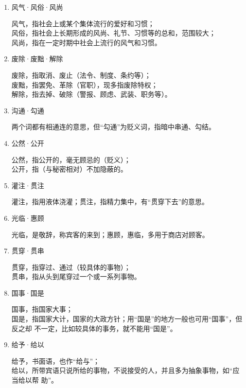 \documentclass[final,oneside]{ctexbook}
\begin{document}
\begin{enumerate}
    分辨，指把两个以上的人或事物区分开，有分析辨别的意思；\\
    分辩，指为消除所受的指责而进行解释、说明，与“辩解”意思相同。

  \item 风气·风俗·风尚

    风气，指社会上或某个集体流行的爱好和习惯；\\
    风俗，指社会上长期形成的风尚、礼节、习惯等的总和，范围较大；\\
    风尚，指在一定时期中社会上流行的风气和习惯。

  \item 废除·废黜·解除

    废除，指取消、废止（法令、制度、条约等）；\\
    废黜，指罢免、革除（官职），现多指废除特权；\\
    解除，指去掉、破除（警报、顾虑、武装、职务等）。

  \item 沟通·勾通

    两个词都有相通连的意思，但“勾通”为贬义词，指暗中串通、勾结。

  \item 公然·公开

    公然，指公开的，毫无顾忌的（贬义）；\\
    公开，指（与秘密相对）不加隐蔽的。

  \item 灌注·贯注

    灌注，指用液体浇灌；贯注，指精力集中，有“贯穿下去”的意思。

  \item 光临·惠顾

    光临，是敬辞，称宾客的来到；惠顾，惠临，多用于商店对顾客。

  \item 贯穿·贯串

    贯穿，指穿过、通过（较具体的事物）；\\
    贯串，指从头到尾穿过一个或一系列事物。

  \item 国事·国是

    国事，指国家大事；\\
    国是，指国家大计，国家的大政方针；用“国是”的地方一般也可用“国事”，但反之却
    不一定，比如较具体的事务，就不能用“国是”。

  \item 给予·给以

    给予，书面语，也作“给与”；\\
    给以，所带宾语只说所给的事物，不说接受的人，并且多为抽象事物，如“应当给以帮
    助”。


\end{enumerate}
\end{document}
